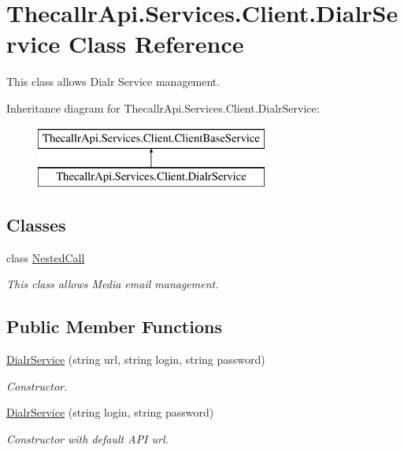\hypertarget{class_thecallr_api_1_1_services_1_1_client_1_1_dialr_service}{\section{Thecallr\+Api.\+Services.\+Client.\+Dialr\+Service Class Reference}
\label{class_thecallr_api_1_1_services_1_1_client_1_1_dialr_service}
}


This class allows Dialr Service management.  


Inheritance diagram for Thecallr\+Api.\+Services.\+Client.\+Dialr\+Service\+:\begin{figure}[H]
\begin{center}
\leavevmode
\includegraphics[height=2.000000cm]{class_thecallr_api_1_1_services_1_1_client_1_1_dialr_service}
\end{center}
\end{figure}
\subsection*{Classes}
\begin{DoxyCompactItemize}
\item 
class \hyperlink{class_thecallr_api_1_1_services_1_1_client_1_1_dialr_service_1_1_nested_call}{Nested\+Call}
\begin{DoxyCompactList}\small\item\em This class allows Media email management. \end{DoxyCompactList}\end{DoxyCompactItemize}
\subsection*{Public Member Functions}
\begin{DoxyCompactItemize}
\item 
\hyperlink{class_thecallr_api_1_1_services_1_1_client_1_1_dialr_service_a6ff3b2633184a10b64ec33cf5a6ed622}{Dialr\+Service} (string url, string login, string password)
\begin{DoxyCompactList}\small\item\em Constructor. \end{DoxyCompactList}\item 
\hyperlink{class_thecallr_api_1_1_services_1_1_client_1_1_dialr_service_a7feeb9842dc52b52351f24d4dbfb5688}{Dialr\+Service} (string login, string password)
\begin{DoxyCompactList}\small\item\em Constructor with default A\+P\+I url. \end{DoxyCompactList}\end{DoxyCompactItemize}
